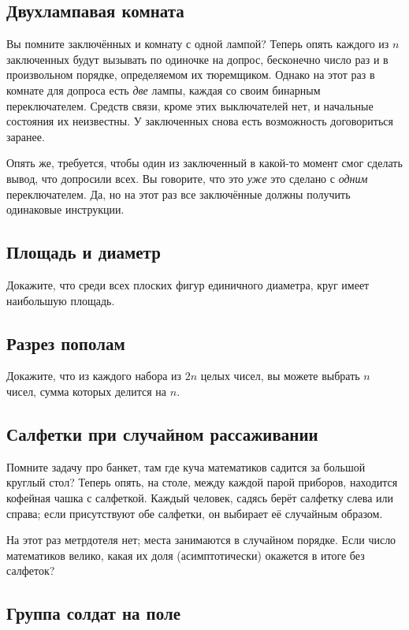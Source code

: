 \subsection*{Двухлампавая комната}%

Вы помните заключённых и комнату с одной лампой?
Теперь опять каждого из $n$ заключенных будут вызывать по одиночке на допрос, бесконечно число раз и в произвольном порядке, определяемом их тюремщиком.
Однако на этот раз в комнате для допроса есть \emph{две} лампы, каждая со своим бинарным переключателем.
Средств связи, кроме этих выключателей нет, и начальные состояния их неизвестны.
У заключенных снова есть возможность договориться заранее.

Опять же, требуется, чтобы один из заключенный в какой-то момент смог сделать вывод, что допросили всех.
Вы говорите, что это \emph{уже} это сделано с \emph{одним} переключателем.
Да, но на этот раз все заключённые должны получить одинаковые инструкции.

\subsection*{Площадь и диаметр}

Докажите, что среди всех плоских фигур единичного диаметра, круг имеет наибольшую площадь.

\subsection*{Разрез пополам}
Докажите, что из каждого набора из $2n$ целых чисел, вы можете выбрать $n$ чисел, сумма которых делится на $n$.

\subsection*{Салфетки при случайном рассаживании}

Помните задачу про банкет, там где куча математиков садится за большой круглый стол?
Теперь опять, на столе, между каждой парой приборов, находится кофейная чашка с салфеткой.
Каждый человек, садясь берёт салфетку слева или справа;
если присутствуют обе салфетки, он выбирает её случайным образом.

На этот раз метрдотеля нет; места занимаются в случайном порядке.
Если число математиков велико, какая их доля (асимптотически) окажется в итоге без салфеток?

\subsection*{Группа солдат на поле}


